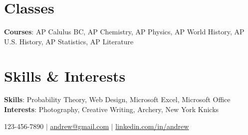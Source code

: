 \documentclass[letterpaper,11pt]{article}
\begin{document}
\section{Classes}
 \begin{itemize}[leftmargin=0.15in, label={}]
    \small{\item{
    \vspace{1mm}
     \textbf{Courses}{: AP Calulus BC, AP Chemistry, AP Physics, AP World History, AP U.S. History, AP Statistics, AP Literature} \\

    }}
 \end{itemize}

\section{Skills \& Interests}
 \begin{itemize}[leftmargin=0.15in, label={}]
    \small{\item{
    \vspace{1mm}
     \textbf{Skills}{: Probability Theory, Web Design, Microsoft Excel, Microsoft Office} \\
     \vspace{1mm}
     \textbf{Interests}{: Photography, Creative Writing, Archery, New York Knicks} \\
     \vspace{1mm}

    }}
 \end{itemize}
 \begin{center}
    
\small 123-456-7890 $|$
\href{mailto:ADD EMAIL HERE@x.com}{\underline{andrew@gmail.com}} $|$
\href{ADD LINKEDIN PAGE HERE}{\underline{linkedin.com/in/andrew}} 
\end{center}
\end{document}
